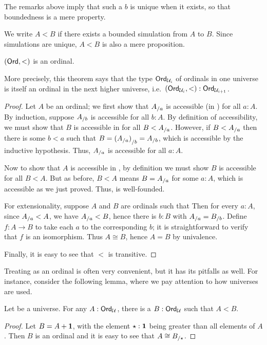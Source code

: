The remarks above imply that such a $b$ is unique when it exists, so that boundedness is a mere property.

We write $A<B$ if there exists a bounded simulation from $A$ to $B$.
Since simulations are unique, $A<B$ is also a mere proposition.

\begin{thm}\label{thm:ordord}
  $(\mathsf{Ord},<)$ is an ordinal.
\end{thm}

\noindent
More precisely, this theorem says that the type $\mathsf{Ord}_{\mathcal{U}_i}$ of ordinals in one universe is itself an ordinal in the next higher universe, i.e.\ $(\mathsf{Ord}_{\mathcal{U}_i},<):\mathsf{Ord}_{\mathcal{U}_{i+1}}$.

\begin{proof}
  Let $A$ be an ordinal; we first show that ${A}_{/a}$ is accessible (in \ord) for all $a:A$.
  By induction, suppose ${A}_{/b}$ is accessible for all $b:A$.
  By definition of accessibility, we must show that $B$ is accessible in \ord for all $B<{A}_{/a}$.
  However, if $B<{A}_{/a}$ then there is some $b<a$ such that $B = {({A}_{/a})}_{/b} = {A}_{/b}$, which is accessible by the inductive hypothesis.
  Thus, ${A}_{/a}$ is accessible for all $a:A$.

  Now to show that $A$ is accessible in \ord, by definition we must show $B$ is accessible for all $B<A$.
  But as before, $B<A$ means $B={A}_{/a}$ for some $a:A$, which is accessible as we just proved.
  Thus, \ord is well-founded.

  For extensionality, suppose $A$ and $B$ are ordinals such that
  Then for every $a:A$, since ${A}_{/a}<A$, we have ${A}_{/a}<B$, hence there is $b:B$ with ${A}_{/a} = {B}_{/b}$.
  Define $f:A\to B$ to take each $a$ to the corresponding $b$; it is straightforward to verify that $f$ is an isomorphism.
  Thus $A\cong B$, hence $A=B$ by univalence.

  Finally, it is easy to see that $<$ is transitive.
\end{proof}

Treating \ord as an ordinal is often very convenient, but it has its pitfalls as well.
For instance, consider the following lemma, where we pay attention to how universes are used.

\begin{lem}\label{thm:ordsucc}
  Let \bbU be a universe.
  For any $A:\mathsf{Ord}_\mathcal{U}$, there is a $B:\mathsf{Ord}_\mathcal{U}$ such that $A<B$.
\end{lem}
\begin{proof}
  Let $B=A+\mathbf{1}$, with the element $\star:\mathbf{1}$ being greater than all elements of $A$.
  Then $B$ is an ordinal and it is easy to see that $A\cong {B}_{/\star}$.
\end{proof}

